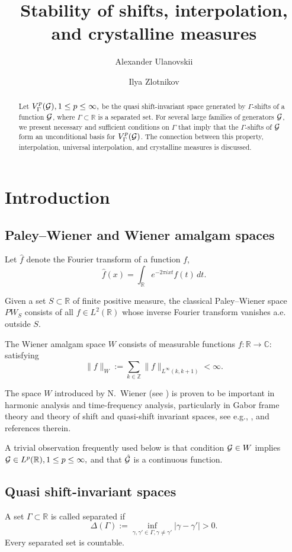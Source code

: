 \documentclass[12pt]{amsart}
\title[Stability of shifts ]{Stability of shifts,  interpolation, and crystalline measures}
\author{Alexander Ulanovskii}
\author{Ilya Zlotnikov}
\numberwithin{equation}{section}
\newcommand{\R}{{\mathbb R}} \newcommand{\Q}{{\mathbb Q}} \newcommand{\Z}{{\mathbb Z}} \newcommand{\N}{{\mathbb N}}
\newcommand{\Cc}{{\mathbb C}}\newcommand{\cc}{{\bf c}} \newcommand{\ab}{{\bf a}} \newcommand{\xx}{{\bf x}} \newcommand{\yy}{{\bf y}}\newcommand{\uu}{{\bf u}}
\begin{document}
\begin{abstract}


Let $V^p_\Gamma(\mathcal{G}),1\leq p\leq\infty,$ be the quasi shift-invariant space generated by $\Gamma$-shifts of a  function $\mathcal{G}$, where $\Gamma\subset\R$ is a separated set. For several large families of generators $\mathcal{G}$, we present necessary and sufficient conditions on $\Gamma$ that imply that the $\Gamma$-shifts of $\mathcal{G}$ form an unconditional basis for $V^p_\Gamma(\mathcal{G})$. The connection between this property, interpolation, universal interpolation, and crystalline measures is discussed.
\end{abstract}
 \date{}\maketitle

\section{Introduction}

\subsection{Paley--Wiener and Wiener amalgam spaces}Let $\hat f$ denote  the  Fourier transform of a function $f$,
$$\hat f(x)=\int_\R e^{-2\pi i xt}f(t)\,dt.$$

 Given a set $S\subset\R$ of finite positive measure, the classical Paley--Wiener space $PW_S$ consists of all $f\in L^2(\R)$ whose inverse Fourier transform vanishes a.e. outside $S$.

The Wiener amalgam space $W$ consists of measurable functions $f: \R \to \Cc:$ satisfying
\begin{equation}\label{wiener}\|f\|_W := \sum\limits_{k \in \Z} \|f\|_{L^\infty (k,k+1)} < \infty.\end{equation}

The space $W$ introduced by N.~Wiener (see \cite{MR1503035}) is proven to be important in harmonic analysis and time-frequency analysis, particularly in Gabor frame theory and theory of shift and quasi-shift invariant spaces, see e.g., \cite{MR1756138,MR2264211,MR1843717}, and references therein.

A trivial observation frequently used below is that condition $\mathcal{G}\in W$ implies $\Ff\in L^p(\R), 1\leq p\leq\infty,$ and that  $\hat{\mathcal{G}}$ is a continuous function.

\subsection{Quasi shift-invariant spaces}
A  set $\Gamma\subset\R$ is called separated  if 
\begin{equation}\label{sepa}
\Delta(\Gamma) := \inf_{\gamma,\gamma'\in\Gamma, \gamma \neq \gamma'}|\gamma-\gamma'|>0.\end{equation}
Every separated set is countable.
\end{document}
